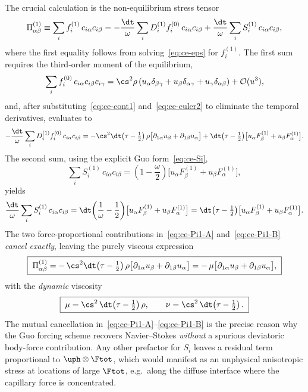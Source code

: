 The crucial calculation is the non-equilibrium stress tensor
\begin{equation}
\Pi^{(1)}_{\alpha\beta} \equiv \sum_i f_i^{(1)}\,c_{i\alpha}c_{i\beta} = -\frac{\dt}{\omega}\sum_i D_i^{(1)}f_i^{(0)}\,c_{i\alpha}c_{i\beta} + \frac{\dt}{\omega}\sum_i S_i^{(1)}\,c_{i\alpha}c_{i\beta},
\end{equation}
where the first equality follows from solving~\eqref{eq:ce-eps} for $f_i^{(1)}$.
The first sum requires the third-order moment of the equilibrium,
\begin{equation}
\sum_i f_i^{(0)}\,c_{i\alpha}c_{i\beta}c_{i\gamma} = \cs^{2}\rho\,(u_\alpha\delta_{\beta\gamma} + u_\beta\delta_{\alpha\gamma} + u_\gamma\delta_{\alpha\beta}) + \mathcal{O}(u^{3}),
\end{equation}
and, after substituting~\eqref{eq:ce-cont1} and~\eqref{eq:ce-euler2} to eliminate the temporal derivatives, evaluates to
\begin{equation}
-\frac{\dt}{\omega}\sum_i D_i^{(1)}f_i^{(0)}\,c_{i\alpha}c_{i\beta} = -\cs^{2}\dt\!\left(\tau - \tfrac{1}{2}\right)\rho\bigl[\partial_{1\alpha}u_\beta + \partial_{1\beta}u_\alpha\bigr] + \dt\!\left(\tau - \tfrac{1}{2}\right)\!\bigl[u_\alpha F^{(1)}_\beta + u_\beta F^{(1)}_\alpha\bigr].
\label{eq:ce-Pi1-A}
\end{equation}
The second sum, using the explicit Guo form~\eqref{eq:ce-Si},
\begin{equation}
\sum_i S_i^{(1)}\,c_{i\alpha}c_{i\beta} = \left(1 - \frac{\omega}{2}\right)\!\bigl[u_\alpha F^{(1)}_\beta + u_\beta F^{(1)}_\alpha\bigr],
\end{equation}
yields
\begin{equation}
\frac{\dt}{\omega}\sum_i S_i^{(1)}\,c_{i\alpha}c_{i\beta} = \dt\!\left(\frac{1}{\omega} - \frac{1}{2}\right)\!\bigl[u_\alpha F^{(1)}_\beta + u_\beta F^{(1)}_\alpha\bigr] = \dt\!\left(\tau - \tfrac{1}{2}\right)\!\bigl[u_\alpha F^{(1)}_\beta + u_\beta F^{(1)}_\alpha\bigr].
\label{eq:ce-Pi1-B}
\end{equation}
The two force-proportional contributions in~\eqref{eq:ce-Pi1-A} and~\eqref{eq:ce-Pi1-B} \emph{cancel exactly}, leaving the purely viscous expression
\begin{equation}
\boxed{\;\Pi^{(1)}_{\alpha\beta} = -\,\cs^{2}\dt\!\left(\tau - \tfrac{1}{2}\right)\rho\bigl[\partial_{1\alpha}u_\beta + \partial_{1\beta}u_\alpha\bigr] = -\,\mu\bigl[\partial_{1\alpha}u_\beta + \partial_{1\beta}u_\alpha\bigr],\;}
\label{eq:ce-Pi1}
\end{equation}
with the \emph{dynamic} viscosity
\begin{equation}
\boxed{\;\mu = \cs^{2}\,\dt\!\left(\tau - \tfrac{1}{2}\right)\rho,\qquad \nu = \cs^{2}\,\dt\!\left(\tau - \tfrac{1}{2}\right).\;}
\label{eq:ce-mu}
\end{equation}
The mutual cancellation in~\eqref{eq:ce-Pi1-A}--\eqref{eq:ce-Pi1-B} is the precise reason why the Guo forcing scheme recovers Navier--Stokes \emph{without} a spurious deviatoric body-force contribution.
Any other prefactor for $S_i$ leaves a residual term proportional to $\uph\otimes\Ftot$, which would manifest as an unphysical anisotropic stress at locations of large $\Ftot$, e.g.\ along the diffuse interface where the capillary force is concentrated.

